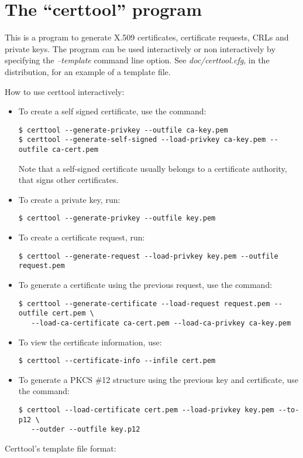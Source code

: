 \section{The ``certtool'' program}

This is a program to generate X.509 certificates, certificate requests, CRLs and
private keys. The program can be used interactively or non interactively by
specifying the \emph{--template} command line option. See \emph{doc/certtool.cfg},
in the distribution, for an example of a template file.

How to use certtool interactively:

\begin{itemize}

\item To create a self signed certificate, use the command:
\begin{verbatim}
$ certtool --generate-privkey --outfile ca-key.pem
$ certtool --generate-self-signed --load-privkey ca-key.pem --outfile ca-cert.pem
\end{verbatim}
Note that a self-signed certificate usually belongs to a certificate
authority, that signs other certificates.

\item To create a private key, run:
\begin{verbatim}
$ certtool --generate-privkey --outfile key.pem
\end{verbatim}

\item To create a certificate request, run:
\begin{verbatim}
$ certtool --generate-request --load-privkey key.pem --outfile request.pem
\end{verbatim}

\item To generate a certificate using the previous request, use the command:
\begin{verbatim}
$ certtool --generate-certificate --load-request request.pem --outfile cert.pem \
   --load-ca-certificate ca-cert.pem --load-ca-privkey ca-key.pem
\end{verbatim}

\item To view the certificate information, use:
\begin{verbatim}
$ certtool --certificate-info --infile cert.pem
\end{verbatim}

\item To generate a PKCS \#12 structure using the previous key and certificate, use the command:
\begin{verbatim}
$ certtool --load-certificate cert.pem --load-privkey key.pem --to-p12 \
   --outder --outfile key.p12
\end{verbatim}


\end{itemize}
\par
Certtool's template file format:


